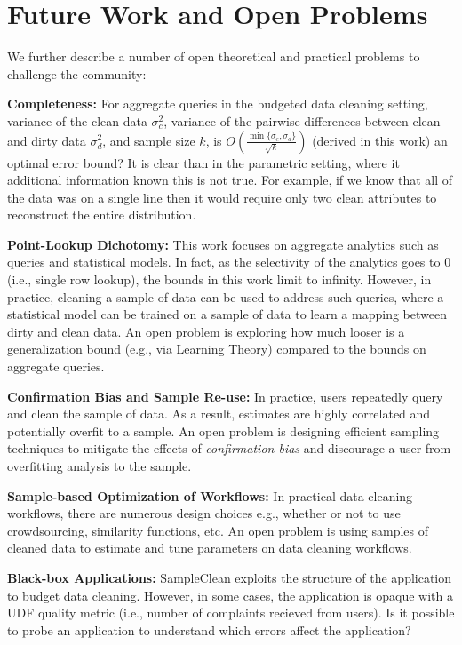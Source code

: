 \section{Future Work and Open Problems}
We further describe a number of open theoretical and practical problems to challenge the community:

\vspace{0.5em}
\noindent \textbf{Completeness: } For aggregate queries in the budgeted data cleaning setting,
variance of the clean data $\sigma_c^2$, variance of the pairwise differences between clean and dirty data $\sigma_d^2$, and sample size $k$, is $O(\frac{\min \{\sigma_c,\sigma_d\}}{\sqrt{k}})$ (derived in this work) an optimal error bound?
It is clear than in the parametric setting, where it additional information known this is not true. For example, if we know that all of the data was on a single line then it would require only two clean attributes to reconstruct the entire distribution. 

\vspace{0.5em}
\noindent \textbf{Point-Lookup Dichotomy: } This work focuses on aggregate analytics such as queries and statistical models. In fact, as the selectivity of the analytics goes to 0 (i.e., single row lookup), the bounds in this work limit to infinity. However, in practice, cleaning a sample of data can be used to address such queries, where a statistical model can be trained on a sample of data to learn a mapping between dirty and clean data. An open problem is exploring how much looser is a generalization bound (e.g., via Learning Theory) compared to the bounds on aggregate queries.

\vspace{0.5em}
\noindent \textbf{Confirmation Bias and Sample Re-use: } In practice, users repeatedly query and clean the sample of data. As a result, estimates are highly correlated and potentially overfit to a sample. An open problem is designing efficient sampling techniques to mitigate the effects of \emph{confirmation bias} and discourage a user from overfitting analysis to the sample.

\vspace{0.5em}
\noindent \textbf{Sample-based Optimization of Workflows: } In practical data cleaning workflows, there are numerous design choices e.g., whether or not to use crowdsourcing, similarity functions, etc. An open problem is using samples of cleaned data to estimate and tune parameters on data cleaning workflows.

\vspace{0.5em}
\noindent \textbf{Black-box Applications: } SampleClean exploits the structure of the application to budget data cleaning. However, in some cases, the application is opaque with a UDF quality metric (i.e., number of complaints recieved from users). Is it possible to probe an application to understand which errors affect the application?

